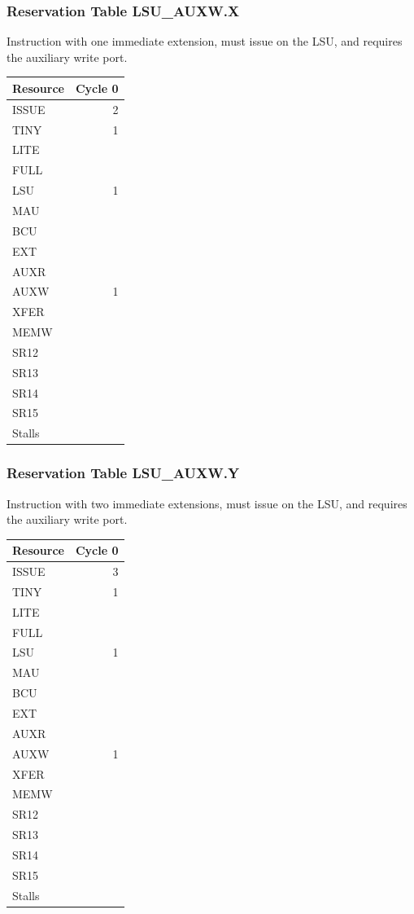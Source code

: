 \subsubsection{Reservation Table LSU\_AUXW.X} \label{sec:reservation-LSU-AUXW.X}

Instruction with one immediate extension, must issue on the LSU, and requires the auxiliary write port.
\medskip

\begin{tabular}{|l|r|} \hline
Resource	& Cycle 0 \\ \hline
\textsf{ISSUE}	& 2	\\
\textsf{TINY}	& 1	\\
\textsf{LITE}	& 	\\
\textsf{FULL}	& 	\\
\textsf{LSU}	& 1	\\
\textsf{MAU}	& 	\\
\textsf{BCU}	& 	\\
\textsf{EXT}	& 	\\
\textsf{AUXR}	& 	\\
\textsf{AUXW}	& 1	\\
\textsf{XFER}	& 	\\
\textsf{MEMW}	& 	\\
\textsf{SR12}	& 	\\
\textsf{SR13}	& 	\\
\textsf{SR14}	& 	\\
\textsf{SR15}	& 	\\
\hline Stalls	& 	\\
\hline \end{tabular}

\subsubsection{Reservation Table LSU\_AUXW.Y} \label{sec:reservation-LSU-AUXW.Y}

Instruction with two immediate extensions, must issue on the LSU, and requires the auxiliary write port.
\medskip

\begin{tabular}{|l|r|} \hline
Resource	& Cycle 0 \\ \hline
\textsf{ISSUE}	& 3	\\
\textsf{TINY}	& 1	\\
\textsf{LITE}	& 	\\
\textsf{FULL}	& 	\\
\textsf{LSU}	& 1	\\
\textsf{MAU}	& 	\\
\textsf{BCU}	& 	\\
\textsf{EXT}	& 	\\
\textsf{AUXR}	& 	\\
\textsf{AUXW}	& 1	\\
\textsf{XFER}	& 	\\
\textsf{MEMW}	& 	\\
\textsf{SR12}	& 	\\
\textsf{SR13}	& 	\\
\textsf{SR14}	& 	\\
\textsf{SR15}	& 	\\
\hline Stalls	& 	\\
\hline \end{tabular}

